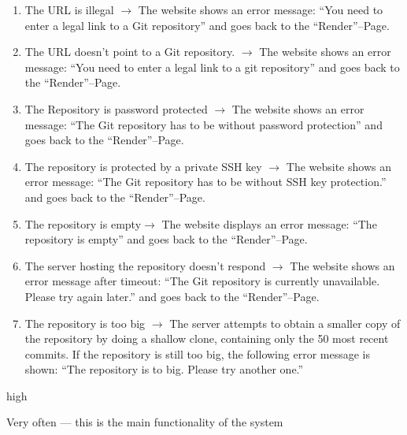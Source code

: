 \documentclass[11pt]{scrartcl}
\begin{document}
\begin{description}[leftmargin=!,labelwidth=\widthof{\bfseries Frequency of use:}]
	\item[Exceptions:]
		\begin{enumerate}[leftmargin=1.5em]
			\item The URL is illegal $\rightarrow$ The website shows an error message:
				\enquote{You need to enter a legal link to a Git repository} and goes
				back to the \enquote{Render}--Page.
			\item The URL doesn't point to a Git repository. $\rightarrow$  The website
				shows an error message: \enquote{You need to enter a legal link to a git
				repository} and goes back to the \enquote{Render}--Page.
			\item The Repository is password protected $\rightarrow$ The website shows an
				error message: \enquote{The Git repository has to be without password
				protection} and goes back to the \enquote{Render}--Page.
			\item The repository is protected by a private SSH key $\rightarrow$ The
				website shows an error message: \enquote{The Git repository has to be
				without SSH key protection.} and goes back to the
				\enquote{Render}--Page.
			\item The repository is empty$\rightarrow$ The website displays an error
				message: \enquote{The repository is empty} and goes back to the
				\enquote{Render}--Page.
			\item The server hosting the repository doesn't respond $\rightarrow$ The
				website shows an error message after timeout: \enquote{The Git
				repository is currently unavailable. Please try again later.} and goes
				back to the \enquote{Render}--Page. 
			\item The repository is too big $\rightarrow$  The server attempts to obtain a
				smaller copy of the repository by doing a shallow clone, containing only
				the 50 most recent commits. If the repository is still too big, the
				following error message is shown: \enquote{The repository is to big. Please try another one.}
		\end{enumerate}

	\item[Priority:] high
	\item[Frequency of use:] Very often --- this is the main functionality of the system

\end{description}
\end{document}
